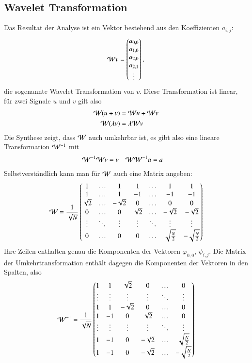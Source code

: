 \subsection{Wavelet Transformation}
Das Resultat der Analyse ist ein Vektor bestehend aus den Koeffizienten
$a_{i,j}$:
$$
{\cal W}v=\begin{pmatrix}a_{0,0}\\a_{1,0}\\a_{2,0}\\a_{2,1}\\\vdots\end{pmatrix},
$$
die sogenannte Wavelet Transformation von $v$.
Diese Transformation ist linear, für zwei Signale $u$ und $v$ gilt also
\begin{align*}
{\cal W}(u+v)&={\cal W}u+{\cal W}v\\
{\cal W}(\lambda v)&=\lambda{\cal W}v
\end{align*}
Die Synthese zeigt, dass ${\cal W}$ auch umkehrbar ist, es gibt also
eine lineare Transformation ${\cal W}^{-1}$ mit
\begin{align*}
{\cal W}^{-1}{\cal W}v&=v
&
{\cal W}{\cal W}^{-1}a&=a
\end{align*}
Selbstverständlich kann man für $\cal W$ auch eine Matrix angeben:
$$
{\cal W}
=
\frac1{\sqrt{N}}
\begin{pmatrix}
1&\dots&1&1&\dots&1&1\\
1&\dots&1&-1&\dots&-1&-1\\
\sqrt{2}&\dots&-\sqrt{2}&0&\dots&0&0\\
0&\dots&0&\sqrt{2}&\dots&-\sqrt{2}&-\sqrt{2}\\
\vdots&\ddots&\vdots&\vdots&\ddots&\vdots&\vdots\\
0&\dots&0&0&\dots&\sqrt{\frac{N}2}&-\sqrt{\frac{N}2}
\end{pmatrix}
$$
Ihre Zeilen enthalten genau die Komponenten der Vektoren
$\varphi_{0,0}$, $\psi_{i,j}$.
Die Matrix der Umkehrtransformation enthält dagegen die
Komponenten der Vektoren in den Spalten, also
$$
{\cal W}^{-1}
=
\frac1{\sqrt{N}}
\begin{pmatrix}
1&1&\sqrt{2}&0&\dots&0\\
\vdots&\vdots&\vdots&\vdots&\ddots&\vdots\\
1&1&-\sqrt{2}&0&\dots&0\\
1&-1&0&\sqrt{2}&\dots&0\\
\vdots&\vdots&\vdots&\vdots&\ddots&\vdots\\
1&-1&0&-\sqrt{2}&\dots&\sqrt{\frac{N}2}\\
1&-1&0&-\sqrt{2}&\dots&-\sqrt{\frac{N}2}
\end{pmatrix}
$$

